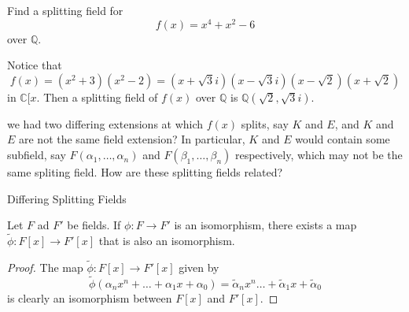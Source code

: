 \documentclass[notoc,notitlepage]{tufte-book}
\begin{document}
\begin{eg}
  Find a splitting field for
  \begin{equation*}
    f(x) = x^4 + x^2 - 6
  \end{equation*}
  over $\mathbb{Q}$.
\end{eg}

\begin{solution}
  Notice that
  \begin{equation*}
    f(x) = (x^2 + 3)(x^2 - 2) = (x + \sqrt{3} i)(x - \sqrt{3}i)(x - \sqrt{2})(x + \sqrt{2})
  \end{equation*}
  in $\mathbb{C}[x$. Then a splitting field of $f(x)$ over $\mathbb{Q}$ is 
  $\mathbb{Q}(\sqrt{2}, \sqrt{3}i)$.
\end{solution}

 we had two differing extensions at which $f(x)$ splits, say $K$ and
$E$, and $K$ and $E$ are not the same field extension? In particular, $K$ and $E$ would contain
some subfield, say $F(\alpha_1, \ldots, \alpha_n)$ and $F(\beta_1, \ldots, \beta_n)$
respectively, which may not be the same spliting field. How are these splitting fields related?

\begin{marginfigure}
  \centering
  \caption{Differing Splitting Fields}
  \label{fig:differing_splitting_fields}
\end{marginfigure}

\begin{lemma}\label{lemma:isomorphic_fields_have_isomorphic_polynomial_rings}
  Let $F$ ad $F'$ be fields. If $\phi : F \to F'$ is an isomorphism, there exists a map
  $\tilde{\phi} : F[x] \to F'[x]$ that is also an isomorphism.
\end{lemma}

\begin{proof}
  The map $\tilde{\phi} : F[x] \to F'[x]$ given by
  \begin{equation*}
    \tilde{\phi}(\alpha_n x^n + \hdots + \alpha_1 x + \alpha_0) = \tilde{\alpha}_n x^n \hdots + \tilde{\alpha}_1 x + \tilde{\alpha}_0
  \end{equation*}
  is clearly an isomorphism between $F[x]$ and $F'[x]$.
\end{proof}
\end{document}
